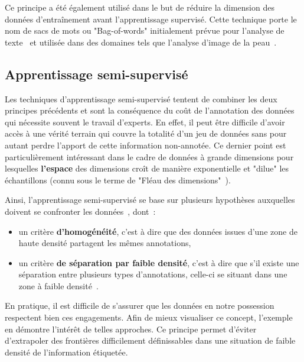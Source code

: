 Ce principe a été également utilisé dans le but de réduire la dimension des données d'entraînement avant l'apprentissage supervisé. Cette technique porte le nom de sacs de mots ou "Bag-of-words" initialement prévue pour l'analyse de texte~\cite{Zhang2010} et utilisée dans des domaines tels que l'analyse d'image de la peau~\cite{Situ2008}.\par

\subsection{Apprentissage semi-supervisé}
\label{sec:semisupervised_learning}
Les techniques d'apprentissage semi-supervisé tentent de combiner les deux principes précédents et sont la conséquence du coût de l'annotation des données qui nécessite souvent le travail d'experts. En effet, il peut être difficile d'avoir accès à une vérité terrain qui couvre la totalité d'un jeu de données sans pour autant perdre l'apport de cette information non-annotée. Ce dernier point est particulièrement intéressant dans le cadre de données à grande dimensions pour lesquelles \textbf{l'espace} des dimensions croît de manière exponentielle et "dilue" les échantillons (connu sous le terme de "Fléau des dimensions"~\cite{Donoho2000}).\par 

Ainsi, l'apprentissage semi-supervisé se base sur plusieurs hypothèses auxquelles doivent se confronter les données~\cite{Zhu2009}, dont~:
\begin{itemize}
	\item un critère \textbf{d'homogénéité}, c'est à dire que des données issues d'une zone de haute densité partagent les mêmes annotations, 
	\item un critère \textbf{de séparation par faible densité}, c'est à dire que s'il existe une  séparation entre plusieurs types d'annotations, celle-ci se situant dans une zone à faible densité~\cite{chapelle2005}.
\end{itemize}
En pratique, il est difficile de s'assurer que les données en notre possession respectent bien ces engagements. Afin de mieux visualiser ce concept, l'exemple en  démontre l'intérêt de telles approches. Ce principe permet d'éviter d'extrapoler des frontières difficilement définissables dans une situation de faible densité de l'information étiquetée.\par
 
